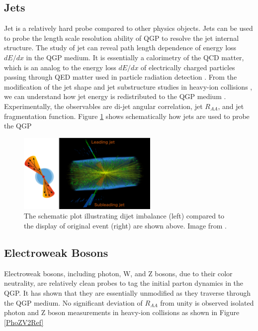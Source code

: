\subsection{Jets}

Jet is a relatively hard probe compared to other physics objects. Jets can be used to probe the length scale resolution ability of QGP to resolve the jet internal structure. The study of jet can reveal path length dependence of energy loss $dE/dx$ in the QGP medium. It is essentially a calorimetry of the QCD matter, which is an analog to the energy loss $dE/dx$ of electrically charged particles passing through QED matter used in particle radiation detection \cite{AlphaTheoEx}. From the modification of the jet shape and jet substructure studies in heavy-ion collisions \cite{ModJetSub}, we can understand how jet energy is redistributed to the QGP medium \cite{ALICEJETSub,CMSJetSub}. Experimentally, the observables are di-jet angular correlation, jet $R_{AA}$, and jet fragmentation function. Figure \ref{JetProbe} shows schematically how jets are used to probe the QGP

 \begin{figure}[hbtp]
\begin{center}
\includegraphics[width=0.60\textwidth]{Figures/Chapter1/CMSJET.png}
\caption{The schematic plot illustrating dijet imbalance (left) compared to the display of original event (right) are shown above. Image from \cite{CMSJETEVENT}.}
\label{JetProbe}
\end{center}
\end{figure}   

\subsection{Electroweak Bosons}

Electroweak bosons, including photon, W, and Z bosons, due to their color neutrality, are relatively clean probes to tag the initial parton dynamics in the QGP. It has shown that they are essentially unmodified as they traverse through the QGP medium. No significant deviation of $R_{AA}$ from unity is observed isolated photon and Z boson measurements in heavy-ion collisions \cite{CMSGammaRef,CMSZRef} as shown in Figure \ref{PhoZV2Ref}

